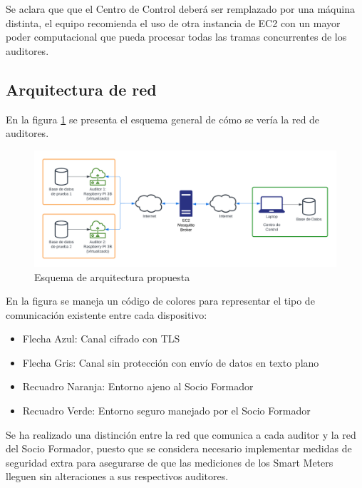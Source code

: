\documentclass{article}
\begin{document}
            Se aclara que que el Centro de Control deberá ser remplazado por una máquina distinta, el equipo recomienda el uso de otra instancia de EC2 con un mayor poder computacional que pueda procesar todas las tramas concurrentes de los auditores.

        \subsection{Arquitectura de red}

            En la figura \ref{fig:proposed_architecture} se presenta el esquema general de cómo se vería la red de auditores.

            \begin{figure}[htbp]
                \centering
                \includegraphics[scale=0.7]{proposed_architecture.png}
                \caption{Esquema de arquitectura propuesta}
                \label{fig:proposed_architecture}
            \end{figure}

            En la figura se maneja un código de colores para representar el tipo de comunicación existente entre cada dispositivo:
            \begin{itemize}[noitemsep, leftmargin=*]
                \item Flecha Azul: Canal cifrado con TLS
                \item Flecha Gris: Canal sin protección con envío de datos en texto plano
                \item Recuadro Naranja: Entorno ajeno al Socio Formador
                \item Recuadro Verde: Entorno seguro manejado por el Socio Formador
            \end{itemize}

            Se ha realizado una distinción entre la red que comunica a cada auditor y la red del Socio Formador, puesto que se considera necesario implementar medidas de seguridad extra para asegurarse de que las mediciones de los Smart Meters lleguen sin alteraciones a sus respectivos auditores.
\end{document}
